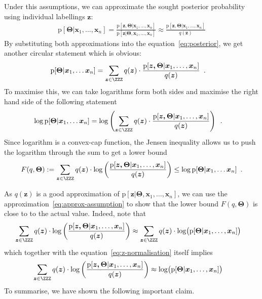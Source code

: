 \documentclass{article}
\renewcommand{\vec}[1]{\boldsymbol{#1}}
\newcommand{\pd}[1]{\mathrm{p}[#1]}
\begin{document}
Under this assumptions, we can approximate the sought posterior probability using individual labellings $\vec{z}$: 
\begin{align}\label{eq:approx-assumption}
\pd{\vec{\Theta}|\vec{x}_1,\ldots,\vec{x}_n}=%
\frac{\pd{\vec{\vec{z},\Theta}|\vec{x}_1,\ldots,\vec{x}_n}}{\pd{\vec{\vec{z}|\Theta},\vec{x}_1,\ldots,\vec{x}_n}} \approx %
\frac{\pd{\vec{\vec{z},\Theta}|\vec{x}_1,\ldots,\vec{x}_n}}{q(\vec{z})}
\end{align}
By substituting both approximations into the equation~\eqref{eq:posterior}, we get another circular statement which is obvious:
\begin{align*}
\pd{\vec{\Theta}|\vec{x}_1,\ldots\vec{x}_n}&=\sum_{\vec{z}\in\ZZZ} q(\vec{z})\cdot
\frac{\pd{\vec{\vec{z},\Theta}|\vec{x}_1,\ldots,\vec{x}_n}}{q(\vec{z})}\enspace.
\end{align*}
To maximise this, we can take logarithms form both sides and maximise the right hand side of the following statement  
\begin{align*}
\log\pd{\vec{\Theta}|\vec{x}_1,\ldots\vec{x}_n}&=\log\left(\sum_{\vec{z}\in\ZZZ} q(\vec{z})\cdot
\frac{\pd{\vec{\vec{z},\Theta}|\vec{x}_1,\ldots,\vec{x}_n}}{q(\vec{z})}\right)\enspace.
\end{align*}
Since logarithm is a convex-cap function, the Jensen inequality allows us to push the logarithm through the sum to get a lower bound
\begin{align}\label{eq:lower-bound}
F(q,\vec{\Theta}):=\sum_{\vec{z}\in\ZZZ} q(\vec{z})\cdot
\log\left(\frac{\pd{\vec{\vec{z},\Theta}|\vec{x}_1,\ldots,\vec{x}_n}}{q(\vec{z})}\right)\leq
\log\pd{\vec{\Theta}|\vec{x}_1,\ldots\vec{x}_n}
\enspace.
\end{align}


As $q(\vec{z})$ is a good approximation of $\pd{\vec{z}|\vec{\Theta},\vec{x}_1,\ldots,\vec{x}_n}$,
we can use the approximation~\eqref{eq:approx-assumption} to 
show that the lower bound $F(q,\vec{\Theta})$ is close to to the actual value. Indeed, note that
\begin{align*}
\sum_{\vec{z}\in\ZZZ} q(\vec{z})\cdot
\log\left(\frac{\pd{\vec{\vec{z},\Theta}|\vec{x}_1,\ldots,\vec{x}_n}}{q(\vec{z})}\right)
&\approx \sum_{\vec{z}\in\ZZZ} q(\vec{z})\cdot \log\bigl(\pd{\vec{\Theta}|\vec{x}_1,\ldots,\vec{x}_n}\bigr)
\end{align*}
which together with the equation~\eqref{eq:z-normalisation} itself implies
\begin{align*}
\sum_{\vec{z}\in\ZZZ} q(\vec{z})\cdot
\log\left(\frac{\pd{\vec{\vec{z},\Theta}|\vec{x}_1,\ldots,\vec{x}_n}}{q(\vec{z})}\right)&\approx \log\bigl(\pd{\vec{\Theta}|\vec{x}_1,\ldots,\vec{x}_n}\bigr)
\end{align*}
To summarise, we have shown the following important claim.
\end{document}
